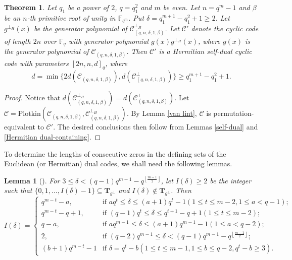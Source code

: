 \documentclass[journal,12pt,onecolumn]{IEEEtran}
\newtheorem{theorem}{Theorem}
\newtheorem{lemma}{Lemma}
\begin{document}
\begin{theorem}
    \label{even Hermitian self-dual}
    Let $q_1$ be a power of $2$, $q=q_1^2$ and $m$ be even. Let $n=q^m-1$ and $\beta$ be an $n$-th primitive root of unity in $\mathbb{F}_{q^m}$. Put $\delta=q_1^{m+1}-q_1^2+1\ge 2$. Let $g^{\perp_H}(x)$ be the generator polynomial of $\mathcal{C}_{(q,n,\delta,1,\beta)}^{\perp_H}$. Let $\mathcal{C}'$ denote the cyclic code of length $2n$ over $\mathbb{F}_q$ with generator polynomial $g(x)g^{\perp_H}(x)$, where $g(x)$ is the generator polynomial of $\mathcal{C}_{(q,n,\delta,1,\beta)}$. Then $\mathcal{C}'$ is a Hermitian self-dual cyclic code with parameters $[2n,n,d]_q$, where \[d=\min\{2d(\mathcal{C}_{(q,n,\delta,1,\beta)}),d(\mathcal{C}_{(q,n,\delta,1,\beta)}^\perp)\}\ge q_1^{m+1}-q_1^2+1.\]
\end{theorem}
\begin{proof}
    Notice that $d(\mathcal{C}^{\perp_H}_{(q,n,\delta,1,\beta)})=d(\mathcal{C}^\perp_{(q,n,\delta,1,\beta)})$. Let $\mathcal{C}=\text{Plotkin}(\mathcal{C}_{(q,n,\delta,1,\beta)},\mathcal{C}^{\perp_H}_{(q,n,\delta,1,\beta)})$.
    By Lemma \ref{van lint}, $\mathcal{C}$ is permutation-equivalent to $\mathcal{C}'$. The desired conclusions then follow from Lemmas \ref{self-dual} and \ref{Hermitian dual-containing}.
\end{proof}

To determine the lengths of consecutive zeros in the defining sets of the Euclidean (or Hermitian) dual codes, we shall need the following lemmas.

\begin{lemma}[\cite{gong2022dual}]
    \label{Euclidean dual BCH}
    For $3 \leq \delta < (q-1)q^{m-1} - q^{\left\lfloor \frac{m-1}{2} \right\rfloor}$, let $I(\delta) \geq 2$ be the integer such that $\{0,1,\dots,I(\delta)-1\} \subseteq \textbf{T}_{g^\perp}$ and $I(\delta) \notin \textbf{T}_{g^\perp}$. Then
    \[
    I(\delta)=
    \begin{cases}
        q^{m-t}-a, & \text{if } aq^t \leq \delta \leq (a+1)q^t-1(1 \leq t \leq m-2,1 \leq a < q-1);\\
        q^{m-t}-q+1, & \text{if } (q-1)q^t \leq \delta \leq q^{t+1}-q+1(1 \leq t \leq m-2);\\
        q-a, & \text{if } aq^{m-1} \leq \delta \leq (a+1)q^{m-1}-1(1 \leq a < q-2);\\
        2, & \text{if } (q-2)q^{m-1} \leq \delta < (q-1)q^{m-1}-q^{\left\lfloor \frac{m-1}{2} \right\rfloor};\\
        (b+1)q^{m-t}-1 & \text{if } \delta=q^t-b(1 \leq t \leq m-1,1 \leq b \leq q-2, q^t-b \geq 3).
    \end{cases}
    \]
\end{lemma}
\end{document}
